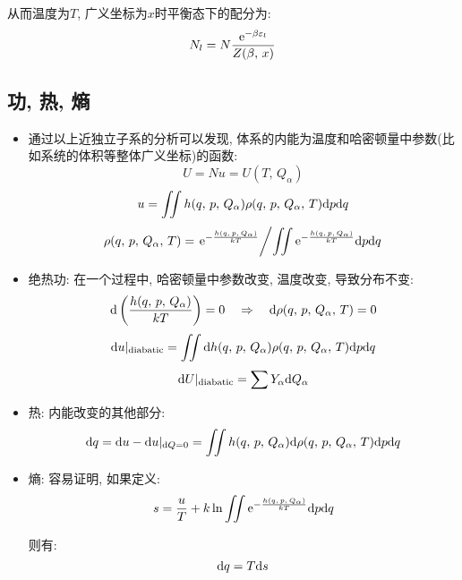 从而温度为$T$, 广义坐标为$x$时平衡态下的配分为:
\[N_l=N\frac{{\rm e}^{-\beta \varepsilon_l}}{Z(\beta,\,x)}\]



\subsection{功, 热, 熵}

\begin{itemize}
	\item 通过以上近独立子系的分析可以发现, 体系的内能为温度和哈密顿量中参数(比如系统的体积等整体广义坐标)的函数:
	\[U=Nu=U(T,\,Q_\alpha)\]
	\[u=\iint h(q,\,p,\,Q_\alpha)\rho (q,\,p,\,Q_\alpha,\,T)\textrm{d} p\textrm{d} q\]
	\[\rho (q,\,p,\,Q_\alpha,\,T)=\left.{\rm e}^{-\frac{h(q,\,p,\,Q_\alpha)}{kT}}\middle/\iint {\rm e}^{-\frac{h(q,\,p,\,Q_\alpha)}{kT}}\textrm{d} p\textrm{d} q\right.\]
	\item 绝热功: 在一个过程中, 哈密顿量中参数改变, 温度改变, 导致分布不变:
	\[\textrm{d}\left(\frac{h(q,\,p,\,Q_\alpha)}{kT}\right)=0\quad \Rightarrow \quad\textrm{d} \rho (q,\,p,\,Q_\alpha,\,T)=0\]
	\[\textrm{d} u|_{\rm diabatic}=\iint \textrm{d} h(q,\,p,\,Q_\alpha)\rho (q,\,p,\,Q_\alpha,\,T)\textrm{d} p\textrm{d} q\]
	\[\textrm{d} U|_{\rm diabatic}=\sum Y_\alpha \textrm{d} Q_\alpha\]

	\item 热: 内能改变的其他部分:
	\[\textrm{d} q=\textrm{d} u-\textrm{d} u|_{\textrm{d} Q=0}=\iint h(q,\,p,\,Q_\alpha)\textrm{d} \rho (q,\,p,\,Q_\alpha,\,T)\textrm{d} p\textrm{d} q\]

	\item 熵: 容易证明, 如果定义:
	\[s=\frac{u}{T}+k\ln \iint{\rm e}^{-\frac{h(q,\,p,\,Q_\alpha)}{kT}}\textrm{d} p\textrm{d} q\]

	则有:
	\[\textrm{d} q=T\textrm{d} s\]
\end{itemize}

